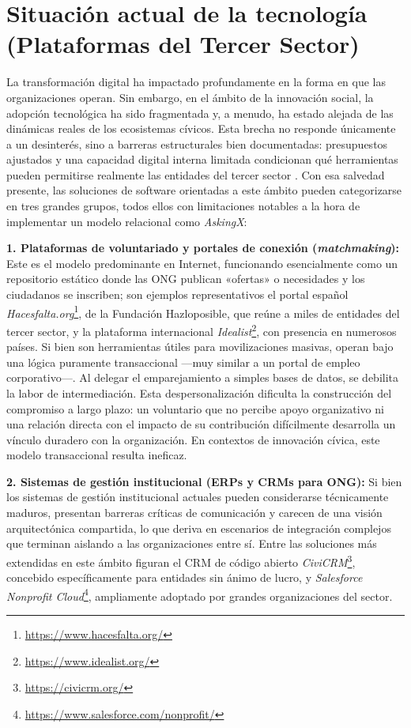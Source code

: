 \documentclass[11pt,oneside,spanish,listoffigures,listoftables]{tfgetsinf}
\begin{document}
\section{Situación actual de la tecnología (Plataformas del Tercer Sector)}

La transformación digital ha impactado profundamente en la forma en que las organizaciones operan. Sin embargo, en el ámbito de la innovación social, la adopción tecnológica ha sido fragmentada y, a menudo, ha estado alejada de las dinámicas reales de los ecosistemas cívicos. Esta brecha no responde únicamente a un desinterés, sino a barreras estructurales bien documentadas: presupuestos ajustados y una capacidad digital interna limitada condicionan qué herramientas pueden permitirse realmente las entidades del tercer sector \cite{godefroid2024barriers}. Con esa salvedad presente, las soluciones de software orientadas a este ámbito pueden categorizarse en tres grandes grupos, todos ellos con limitaciones notables a la hora de implementar un modelo relacional como \textit{AskingX}:

\textbf{1. Plataformas de voluntariado y portales de conexión (\textit{matchmaking}):}
Este es el modelo predominante en Internet, funcionando esencialmente como un repositorio estático donde las ONG publican «ofertas» o necesidades y los ciudadanos se inscriben; son ejemplos representativos el portal español \textit{Hacesfalta.org}\footnote{\url{https://www.hacesfalta.org/}}, de la Fundación Hazloposible, que reúne a miles de entidades del tercer sector, y la plataforma internacional \textit{Idealist}\footnote{\url{https://www.idealist.org/}}, con presencia en numerosos países. Si bien son herramientas útiles para movilizaciones masivas, operan bajo una lógica puramente transaccional —muy similar a un portal de empleo corporativo—. Al delegar el emparejamiento a simples bases de datos, se debilita la labor de intermediación. Esta despersonalización dificulta la construcción del compromiso a largo plazo: un voluntario que no percibe apoyo organizativo ni una relación directa con el impacto de su contribución difícilmente desarrolla un vínculo duradero con la organización. En contextos de innovación cívica, este modelo transaccional resulta ineficaz.

\textbf{2. Sistemas de gestión institucional (ERPs y CRMs para ONG):}
Si bien los sistemas de gestión institucional actuales pueden considerarse técnicamente maduros, presentan barreras críticas de comunicación y carecen de una visión arquitectónica compartida, lo que deriva en escenarios de integración complejos que terminan aislando a las organizaciones entre sí. Entre las soluciones más extendidas en este ámbito figuran el CRM de código abierto \textit{CiviCRM}\footnote{\url{https://civicrm.org/}}, concebido específicamente para entidades sin ánimo de lucro, y \textit{Salesforce Nonprofit Cloud}\footnote{\url{https://www.salesforce.com/nonprofit/}}, ampliamente adoptado por grandes organizaciones del sector.
\end{document}
